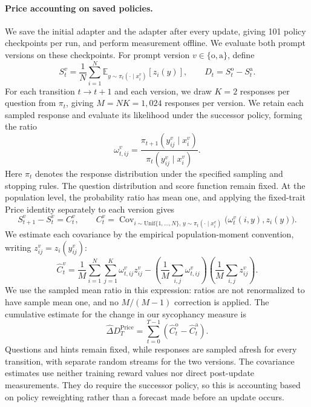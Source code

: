 \paragraph{Price accounting on saved policies.}
We save the initial adapter and the adapter after every update, giving
101 policy checkpoints per run, and perform measurement offline.
We evaluate both prompt versions on these checkpoints.
For prompt version $v\in\{\mathrm{o},\mathrm{a}\}$, define
\[
 S_t^v=\frac{1}{N}\sum_{i=1}^{N}
       \mathbb{E}_{y\sim\pi_t(\cdot\mid x_i^v)}[z_i(y)],
 \qquad D_t=S_t^{\mathrm{o}}-S_t^{\mathrm{a}}.
\]
For each transition $t\to t+1$ and each version, we draw $K=2$ responses
per question from $\pi_t$, giving $M=NK=1,024$ responses per version.
We retain each sampled response and evaluate its likelihood under the
successor policy, forming the ratio
\[
 \omega^v_{t,ij}
 =\frac{\pi_{t+1}(y^v_{ij}\mid x_i^v)}
        {\pi_t(y^v_{ij}\mid x_i^v)}.
\]
Here $\pi_t$ denotes the response distribution under the specified sampling
and stopping rules. The question distribution and score function remain
fixed. At the population level, the probability ratio has mean one, and
applying the fixed-trait Price identity separately to each version gives
\[
 S_{t+1}^v-S_t^v=C_t^v,
 \qquad
 C_t^v=\operatorname{Cov}_{i\sim\mathrm{Unif}\{1,\ldots,N\},\,
 y\sim\pi_t(\cdot\mid x_i^v)}\bigl(\omega_t^v(i,y),z_i(y)\bigr).
\]
We estimate each covariance by the empirical population-moment convention,
writing $z^v_{ij}=z_i(y^v_{ij})$:
\[
 \widehat C_t^v
 =\frac{1}{M}\sum_{i=1}^{N}\sum_{j=1}^{K}\omega^v_{t,ij}z^v_{ij}
  -\left(\frac{1}{M}\sum_{i,j}\omega^v_{t,ij}\right)
   \left(\frac{1}{M}\sum_{i,j}z^v_{ij}\right).
\]
We use the sampled mean ratio in this expression: ratios are not
renormalized to have sample mean one, and no $M/(M-1)$ correction is applied.
The cumulative estimate for the change in our sycophancy measure is
\[
 \widehat\Delta D_T^{\mathrm{Price}}
 =\sum_{t=0}^{T-1}\left(\widehat C_t^{\mathrm{o}}
                      -\widehat C_t^{\mathrm{a}}\right).
\]
Questions and hints remain fixed, while responses are sampled afresh for
every transition, with separate random streams for the two versions.
The covariance estimates use neither training reward values nor direct
post-update measurements. They do require the successor policy, so this
is accounting based on policy reweighting rather than a forecast made
before an update occurs.

